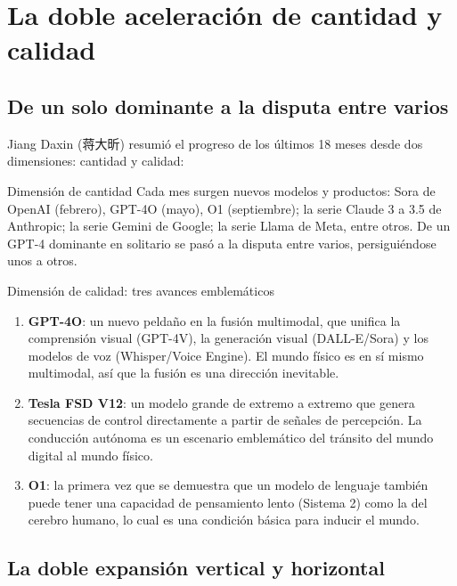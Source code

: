\section{La doble aceleración de cantidad y calidad}

\subsection{De un solo dominante a la disputa entre varios}

Jiang Daxin (蒋大昕) resumió el progreso de los últimos 18 meses desde dos dimensiones: cantidad y calidad:

\begin{knowledgebox}{Dimensión de cantidad}
Cada mes surgen nuevos modelos y productos: Sora de OpenAI (febrero), GPT-4O (mayo), O1 (septiembre); la serie Claude 3 a 3.5 de Anthropic; la serie Gemini de Google; la serie Llama de Meta, entre otros. De un GPT-4 dominante en solitario se pasó a la disputa entre varios, persiguiéndose unos a otros.
\end{knowledgebox}

\begin{importantbox}{Dimensión de calidad: tres avances emblemáticos}
\begin{enumerate}
\item \textbf{GPT-4O}: un nuevo peldaño en la fusión multimodal, que unifica la comprensión visual (GPT-4V), la generación visual (DALL-E/Sora) y los modelos de voz (Whisper/Voice Engine). El mundo físico es en sí mismo multimodal, así que la fusión es una dirección inevitable.
\item \textbf{Tesla FSD V12}: un modelo grande de extremo a extremo que genera secuencias de control directamente a partir de señales de percepción. La conducción autónoma es un escenario emblemático del tránsito del mundo digital al mundo físico.
\item \textbf{O1}: la primera vez que se demuestra que un modelo de lenguaje también puede tener una capacidad de pensamiento lento (Sistema 2) como la del cerebro humano, lo cual es una condición básica para inducir el mundo.
\end{enumerate}
\end{importantbox}

\subsection{La doble expansión vertical y horizontal}

